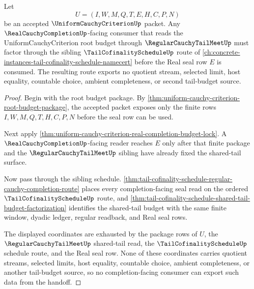 \begin{theorem}
\label{thm:uniform-cauchy-criterion-tail-cofinality-schedule-handoff}
Let
$$
U=(I,W,M,Q,T,E,H,C,P,N)
$$
be an accepted $\UniformCauchyCriterionUp$ packet. Any $\RealCauchyCompletionUp$-facing consumer that reads the UniformCauchyCriterion root budget through $\RegularCauchyTailMeetUp$ must factor through the sibling $\TailCofinalityScheduleUp$ route of \autoref{ch:concrete-instances-tail-cofinality-schedule-namecert} before the Real seal row $E$ is consumed. The resulting route exports no quotient stream, selected limit, host equality, countable choice, ambient completeness, or second tail-budget source.
\end{theorem}
\begin{proof}
Begin with the root budget package. By \autoref{thm:uniform-cauchy-criterion-root-budget-package}, the accepted packet exposes only the finite rows $I,W,M,Q,T,H,C,P,N$ before the seal row can be used.

Next apply \autoref{thm:uniform-cauchy-criterion-real-completion-budget-lock}. A $\RealCauchyCompletionUp$-facing reader reaches $E$ only after that finite package and the $\RegularCauchyTailMeetUp$ sibling have already fixed the shared-tail surface.

Now pass through the sibling schedule. \autoref{thm:tail-cofinality-schedule-regular-cauchy-completion-route} places every completion-facing seal read on the ordered $\TailCofinalityScheduleUp$ route, and \autoref{thm:tail-cofinality-schedule-shared-tail-budget-factorization} identifies the shared-tail budget with the same finite window, dyadic ledger, regular readback, and Real seal rows.

The displayed coordinates are exhausted by the package rows of $U$, the $\RegularCauchyTailMeetUp$ shared-tail read, the $\TailCofinalityScheduleUp$ schedule route, and the Real seal row. None of these coordinates carries quotient streams, selected limits, host equality, countable choice, ambient completeness, or another tail-budget source, so no completion-facing consumer can export such data from the handoff.
\end{proof}

